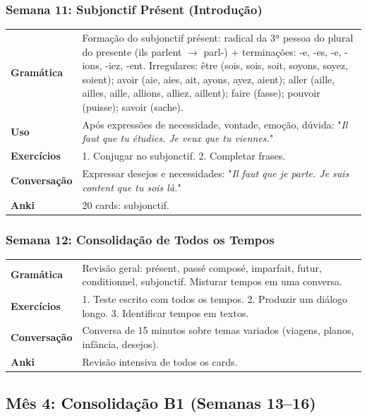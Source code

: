 \documentclass[a4paper,12pt]{article}
\begin{document}
\subsubsection*{Semana 11: Subjonctif Présent (Introdução)}
\begin{tabularx}{\linewidth}{>{\bfseries}l L}
    Gramática & Formação do subjonctif présent: radical da 3ª pessoa do plural do presente (ils parlent $\to$ parl-) + terminações: -e, -es, -e, -ions, -iez, -ent. Irregulares: être (sois, sois, soit, soyons, soyez, soient); avoir (aie, aies, ait, ayons, ayez, aient); aller (aille, ailles, aille, allions, alliez, aillent); faire (fasse); pouvoir (puisse); savoir (sache). \\
    Uso & Após expressões de necessidade, vontade, emoção, dúvida: "\emph{Il faut que tu étudies. Je veux que tu viennes.}" \\
    Exercícios & 1. Conjugar no subjonctif. 2. Completar frases. \\
    Conversação & Expressar desejos e necessidades: "\emph{Il faut que je parte. Je suis content que tu sois là.}" \\
    Anki & 20 cards: subjonctif. \\
\end{tabularx}

\subsubsection*{Semana 12: Consolidação de Todos os Tempos}
\begin{tabularx}{\linewidth}{>{\bfseries}l L}
    Gramática & Revisão geral: présent, passé composé, imparfait, futur, conditionnel, subjonctif. Misturar tempos em uma conversa. \\
    Exercícios & 1. Teste escrito com todos os tempos. 2. Produzir um diálogo longo. 3. Identificar tempos em textos. \\
    Conversação & Conversa de 15 minutos sobre temas variados (viagens, planos, infância, desejos). \\
    Anki & Revisão intensiva de todos os cards. \\
\end{tabularx}

\subsection{Mês 4: Consolidação B1 (Semanas 13–16)}
\end{document}
